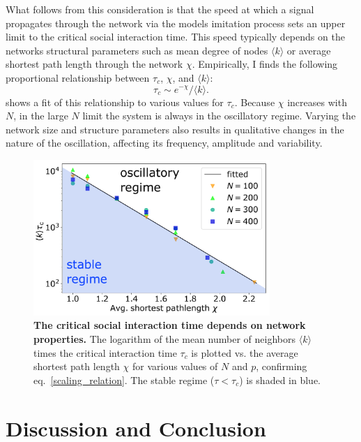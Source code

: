 What follows from this consideration is that the speed at which a signal propagates through the network via the models imitation process sets an upper limit to the critical social interaction time. This speed typically depends on the networks structural parameters such as mean degree of nodes $\langle k \rangle$ or average shortest path length through the network $\chi$.
Empirically, I finds the following proportional relationship between $\tau_c$, $\chi$, and $\langle k \rangle$:
\begin{equation}
\tau_c \sim e^{-\chi} / \langle k \rangle.
\label{scaling_relation}
\end{equation}  
 shows a fit of this relationship to various values for $\tau_{c}$.  Because $\chi$ increases with $N$, in the large $N$ limit the system is always in the oscillatory regime. Varying the network size and structure parameters also results in qualitative changes in the nature of the oscillation, affecting its frequency, amplitude and variability.

\begin{figure}[t]
     \centering
       \includegraphics[width=0.8\textwidth]
       {figures/fig4.pdf}
       \caption[Scalling behavior of critical social interaction time]{\textbf{The critical social interaction time depends on network properties.}
	The logarithm of the mean number of neighbors $\langle k \rangle$  times the critical interaction time $\tau_{c}$ is plotted vs. the average shortest path length $\chi$ for various values of $N$ and $p$, confirming eq.~\eqref{scaling_relation}. The stable regime ($\tau \! < \! \tau_{c}$) is shaded in blue. 
   \label{taucrit}}
\end{figure}

\section{Discussion and Conclusion}

